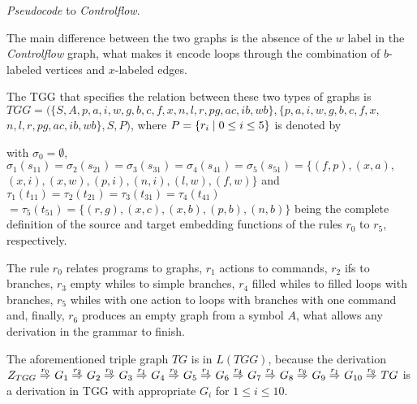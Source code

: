 \begin{example}{\emph{Pseudocode} to \emph{Controlflow}.}
	
	
	The main difference between the two graphs is the absence of the $w$ label in the \emph{Controlflow} graph, what makes it encode loops through the combination of $b$-labeled vertices and $x$-labeled edges.
	
	The TGG that specifies the relation between these two types of graphs is $TGG = (\{S, A, p, a, i, w, g, b, c, f, x, n, l, r, pg, ac, ib, wb\}, \{p, a, i, w, g, b, c, f, x,$ $ n, l, r, pg, ac, ib, wb\}, S, P)$, where $P = \{r_i \; | \; 0 \le i \le 5\}$ is denoted by
	
	
	
	with $\sigma_0 = \emptyset$, $\sigma_1(s_{11}) = \sigma_2(s_{21}) = \sigma_3(s_{31}) = \sigma_4(s_{41}) =\sigma_5(s_{51}) = \{ (f,p), (x,a), $ $(x,i), (x,w), (p,i), (n,i), (l,w), (f,w) \}$ and $\tau_1(t_{11}) = \tau_2(t_{21}) = \tau_3(t_{31}) = \tau_4(t_{41}) $ $= \tau_5(t_{51}) = \{ (r,g), (x,c), (x,b), (p,b), (n,b)\}$ being the complete definition of the source and target embedding functions of the rules $r_0$ to $r_5$, respectively.
	
	The rule $r_0$ relates programs to graphs, $r_1$ actions to commands, $r_2$ ifs to branches, $r_3$ empty whiles to simple branches, $r_4$ filled whiles to filled loops with branches, $r_5$ whiles with one action to loops with branches with one command and, finally, $r_6$ produces an empty graph from a symbol $A$, what allows any derivation in the grammar to finish.
	
	The aforementioned triple graph $TG$ is in $L(TGG)$, because the derivation
	$
	\startTG{TGG} \tderiv{r_0}{}{} G_1 \tderiv{r_2}{}{} G_2 \tderiv{r_6}{}{} G_3 \tderiv{r_1}{}{} G_4 \tderiv{r_6}{}{} G_5 \tderiv{r_1}{}{} G_6 \tderiv{r_4}{}{} G_7 \tderiv{r_1}{}{} G_8 \tderiv{r_6}{}{} G_9 \tderiv{r_1}{}{} G_{10} \tderiv{r_6}{}{} TG
	$
	is a derivation in TGG with appropriate $G_i$ for $1 \le i \le 10$.
\end{example}

